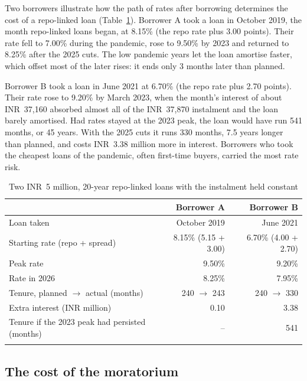 \documentclass[sn-basic]{sn-jnl}
\newcommand{\INR}{INR~}
\begin{document}
Two borrowers illustrate how the path of rates after borrowing determines the cost of a repo-linked loan (Table~\ref{tab:cycle}). Borrower A took a loan in October 2019, the month repo-linked loans began, at 8.15\% (the repo rate plus 3.00 points). Their rate fell to 7.00\% during the pandemic, rose to 9.50\% by 2023 and returned to 8.25\% after the 2025 cuts. The low pandemic years let the loan amortise faster, which offset most of the later rises: it ends only 3 months later than planned.

Borrower B took a loan in June 2021 at 6.70\% (the repo rate plus 2.70 points). Their rate rose to 9.20\% by March 2023, when the month's interest of about \INR 37,160 absorbed almost all of the \INR 37,870 instalment and the loan barely amortised. Had rates stayed at the 2023 peak, the loan would have run 541 months, or 45 years. With the 2025 cuts it runs 330 months, 7.5 years longer than planned, and costs \INR 3.38 million more in interest. Borrowers who took the cheapest loans of the pandemic, often first-time buyers, carried the most rate risk.

\begin{table}[h]
\caption{Two \INR 5 million, 20-year repo-linked loans with the instalment held constant}\label{tab:cycle}
\footnotesize
\begin{tabular}{@{}lrr@{}}
\toprule
 & Borrower A & Borrower B \\
\midrule
Loan taken & October 2019 & June 2021 \\
Starting rate (repo + spread) & 8.15\% (5.15 + 3.00) & 6.70\% (4.00 + 2.70) \\
Peak rate & 9.50\% & 9.20\% \\
Rate in 2026 & 8.25\% & 7.95\% \\
Tenure, planned $\to$ actual (months) & 240 $\to$ 243 & 240 $\to$ 330 \\
Extra interest (INR million) & 0.10 & 3.38 \\
Tenure if the 2023 peak had persisted (months) & -- & 541 \\
\botrule
\end{tabular}
\end{table}

\subsection{The cost of the moratorium}
\end{document}
